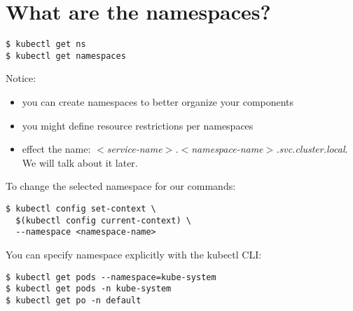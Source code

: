 \documentclass[12pt, letterpaper]{article}
\begin{document}
\begin{figure}[ht]
\centering
{}
\end{figure}



\section{What are the namespaces?}

\begin{verbatim}
$ kubectl get ns
$ kubectl get namespaces
\end{verbatim}

Notice:
\begin{itemize}
    \item you can create namespaces to better organize your components
    \item you might define resource restrictions per namespaces
    \item effect the name: \textit{$<$service-name$>$.$<$namespace-name$>$.svc.cluster.local}. We will talk about it later.
\end{itemize}

To change the selected namespace for our commands:

\begin{verbatim}
$ kubectl config set-context \
  $(kubectl config current-context) \
  --namespace <namespace-name>
\end{verbatim}

You can specify namespace explicitly with the kubectl {\small CLI}:

\begin{verbatim}
$ kubectl get pods --namespace=kube-system
$ kubectl get pods -n kube-system
$ kubectl get po -n default
\end{verbatim}
\end{document}
